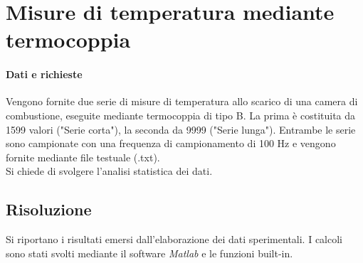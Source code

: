 \section{Misure di temperatura mediante termocoppia}
\paragraph{Dati e richieste}
Vengono fornite due serie di misure di temperatura allo scarico di una camera di combustione, eseguite mediante termocoppia di tipo B. La prima è costituita da 1599 valori ("Serie corta"), la seconda da 9999 ("Serie lunga"). Entrambe le serie sono campionate con una frequenza di campionamento di 100 Hz e vengono fornite mediante file testuale (.txt).\\
Si chiede di svolgere l'analisi statistica dei dati.
\subsection{Risoluzione}
Si riportano i risultati emersi dall'elaborazione dei dati sperimentali. I calcoli sono stati svolti mediante il software \textit{Matlab} e le funzioni built-in.
